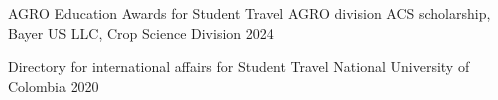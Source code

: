 
\begin{cvhonors}

  \cvhonor
    {AGRO Education Awards for Student Travel} %
    {AGRO division ACS scholarship, Bayer US LLC, Crop Science Division } %
    {} %
    {2024} %

  \cvhonor
    {Directory for international affairs for Student Travel} %
    {National University of Colombia} %
    {} %
    {2020} %


\end{cvhonors}






